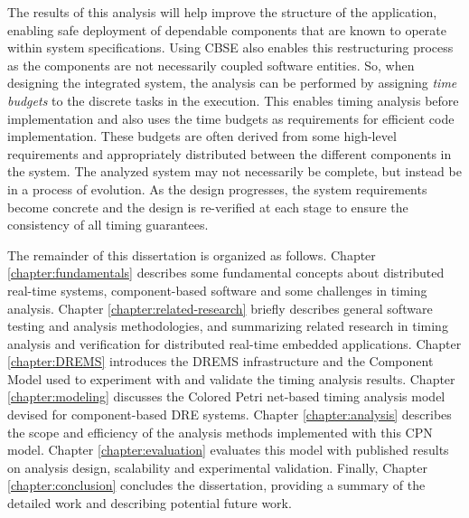 The results of this analysis will help improve the structure of the application, enabling safe deployment of dependable components that are known to operate within system specifications. Using CBSE also enables this restructuring process as the components are not necessarily coupled software entities. So, when designing the integrated system, the analysis can be performed by assigning \emph{time budgets} to the discrete tasks in the execution. This enables timing analysis before implementation and also uses the time budgets as requirements for efficient code implementation. These budgets are often derived from some high-level requirements and appropriately distributed between the different components in the system. The analyzed system may not necessarily be complete, but instead be in a process of evolution. As the design progresses, the system requirements become concrete and the design is re-verified at each stage to ensure the consistency of all timing guarantees. 

The remainder of this dissertation is organized as follows. Chapter \ref{chapter:fundamentals} describes some fundamental concepts about distributed real-time systems, component-based software and some challenges in timing analysis. Chapter \ref{chapter:related-research} briefly describes general software testing and analysis methodologies, and summarizing related research in timing analysis and verification for distributed real-time embedded applications. Chapter \ref{chapter:DREMS} introduces the DREMS infrastructure and the Component Model used to experiment with and validate the timing analysis results. Chapter \ref{chapter:modeling} discusses the Colored Petri net-based timing analysis model devised for component-based DRE systems. Chapter \ref{chapter:analysis} describes the scope and efficiency of the analysis methods implemented with this CPN model. Chapter \ref{chapter:evaluation} evaluates this model with published results on analysis design, scalability and experimental validation. Finally, Chapter \ref{chapter:conclusion} concludes the dissertation, providing a summary of the detailed work and describing potential future work.